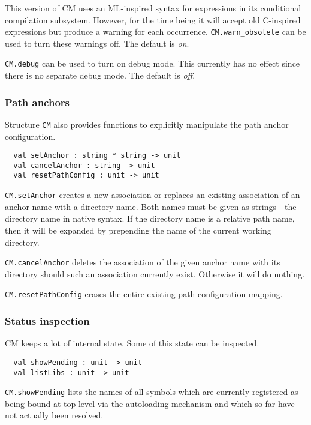 \documentclass{article}
\begin{document}
This version of CM uses an ML-inspired syntax for expressions in its
conditional compilation subsystem.  However, for the time being it
will accept old C-inspired expressions but produce a warning for each
occurrence. {\tt CM.warn\_obsolete} can be used to turn these warnings
off. The default is {\em on}.

{\tt CM.debug} can be used to turn on debug mode.  This currently has
no effect since there is no separate debug mode. The default is {\em off}.

\subsubsection*{Path anchors}

Structure {\tt CM} also provides functions to explicitly manipulate
the path anchor configuration.

\begin{verbatim}
  val setAnchor : string * string -> unit
  val cancelAnchor : string -> unit
  val resetPathConfig : unit -> unit
\end{verbatim}

{\tt CM.setAnchor} creates a new association or replaces an existing
association of an anchor name with a directory name.  Both names must
be given as strings---the directory name in native syntax.  If the
directory name is a relative path name, then it will be expanded by
prepending the name of the current working directory.

{\tt CM.cancelAnchor} deletes the association of the given anchor name
with its directory should such an association currently exist.
Otherwise it will do nothing.

{\tt CM.resetPathConfig} erases the entire existing path configuration
mapping.

\subsubsection*{Status inspection}

CM keeps a lot of internal state.  Some of this state can be inspected.

\begin{verbatim}
  val showPending : unit -> unit
  val listLibs : unit -> unit
\end{verbatim}

{\tt CM.showPending} lists the names of all symbols which are
currently registered as being bound at top level via the autoloading
mechanism and which so far have not actually been resolved.
\end{document}
